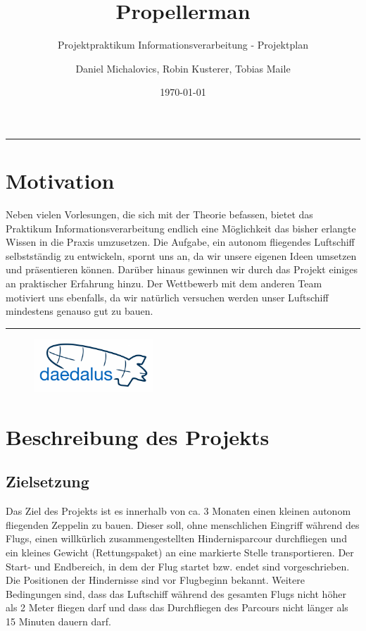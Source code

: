 \documentclass[lang=ngerman,inputenc=utf8,fontsize=10pt]{ldvarticle}
\title{Propellerman}
\subtitle{Projektpraktikum Informationsverarbeitung - Projektplan}
\author{Daniel Michalovics, Robin Kusterer, Tobias Maile}
\date{\today}
\begin{document}
\maketitle	
\thispagestyle{empty}
\vspace*{2cm}

\hrule

\section*{Motivation}

Neben vielen Vorlesungen, die sich mit der Theorie befassen, bietet das Praktikum Informationsverarbeitung endlich eine Möglichkeit das bisher erlangte Wissen in die Praxis umzusetzen. Die Aufgabe, ein autonom fliegendes Luftschiff selbstständig zu entwickeln, spornt uns an, da wir unsere eigenen Ideen umsetzen und präsentieren können. Darüber hinaus gewinnen wir durch das Projekt einiges an praktischer Erfahrung hinzu. Der Wettbewerb mit dem anderen Team motiviert uns ebenfalls, da wir natürlich versuchen werden unser Luftschiff mindestens genauso gut zu bauen.




\vspace*{1cm}
\hrule


\begin{figure}[!b]
\centering
\includegraphics[width=0.4\textwidth]{logo_kl.png}
\end{figure}

\newpage


\section{Beschreibung des Projekts}

\subsection*{Zielsetzung}
Das Ziel des Projekts ist es innerhalb von ca. 3 Monaten einen kleinen autonom fliegenden Zeppelin zu bauen. Dieser soll, ohne menschlichen Eingriff während des Flugs, einen willkürlich zusammengestellten Hindernisparcour durchfliegen und ein kleines Gewicht (Rettungspaket) an eine markierte Stelle transportieren. Der Start- und Endbereich, in dem der Flug startet bzw. endet sind vorgeschrieben. Die Positionen der Hindernisse sind vor Flugbeginn bekannt. Weitere Bedingungen sind, dass das Luftschiff während des gesamten Flugs nicht höher als 2 Meter fliegen darf und dass das Durchfliegen des Parcours nicht länger als 15 Minuten dauern darf.
\end{document}
